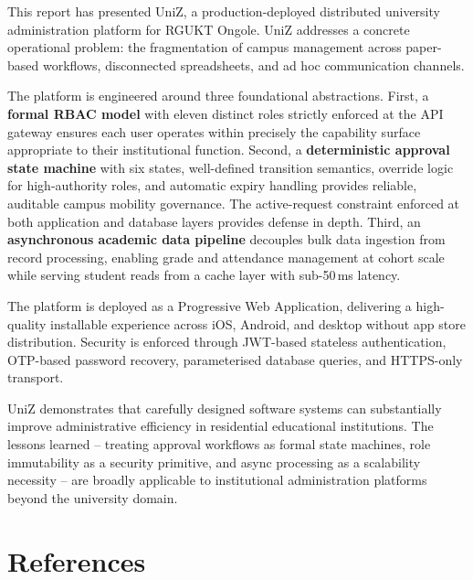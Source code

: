 \documentclass[12pt,a4paper]{report}
\begin{document}
This report has presented UniZ, a production-deployed distributed university administration platform for RGUKT Ongole. UniZ addresses a concrete operational problem: the fragmentation of campus management across paper-based workflows, disconnected spreadsheets, and ad hoc communication channels.

The platform is engineered around three foundational abstractions. First, a \textbf{formal RBAC model} with eleven distinct roles strictly enforced at the API gateway ensures each user operates within precisely the capability surface appropriate to their institutional function. Second, a \textbf{deterministic approval state machine} with six states, well-defined transition semantics, override logic for high-authority roles, and automatic expiry handling provides reliable, auditable campus mobility governance. The active-request constraint enforced at both application and database layers provides defense in depth. Third, an \textbf{asynchronous academic data pipeline} decouples bulk data ingestion from record processing, enabling grade and attendance management at cohort scale while serving student reads from a cache layer with sub-50\,ms latency.

The platform is deployed as a Progressive Web Application, delivering a high-quality installable experience across iOS, Android, and desktop without app store distribution. Security is enforced through JWT-based stateless authentication, OTP-based password recovery, parameterised database queries, and HTTPS-only transport.

UniZ demonstrates that carefully designed software systems can substantially improve administrative efficiency in residential educational institutions. The lessons learned -- treating approval workflows as formal state machines, role immutability as a security primitive, and async processing as a scalability necessity -- are broadly applicable to institutional administration platforms beyond the university domain.

\chapter*{References}
\end{document}
